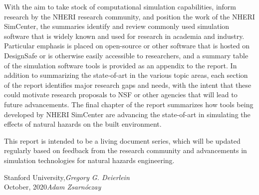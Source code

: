 With the aim to take stock of computational simulation capabilities, inform research by the NHERI research community, and position the work of the NHERI SimCenter, the summaries identify and review commonly used simulation software that is widely known and used for research in academia and industry. Particular emphasis is placed on open-source or other software that is hosted on DesignSafe or is otherwise easily accessible to researchers, and a summary table of the simulation software tools is provided as an appendix to the report. In addition to summarizing the state-of-art in the various topic areas, each section of the report identifies major research gaps and needs, with the intent that these could motivate research proposals to NSF or other agencies that will lead to future advancements. The final chapter of the report summarizes how tools being developed by NHERI SimCenter are advancing the state-of-art in simulating the effects of natural hazards on the built environment.

This report is intended to be a living document series, which will be updated regularly based on feedback from the research community and advancements in simulation technologies for natural hazards engineering.

\vspace{\baselineskip}
\begin{flushright}\noindent
Stanford University,\hfill {\it Gregory G. Deierlein}\\
October, 2020\hfill {\it Adam Zsarnóczay}\\
\end{flushright}


